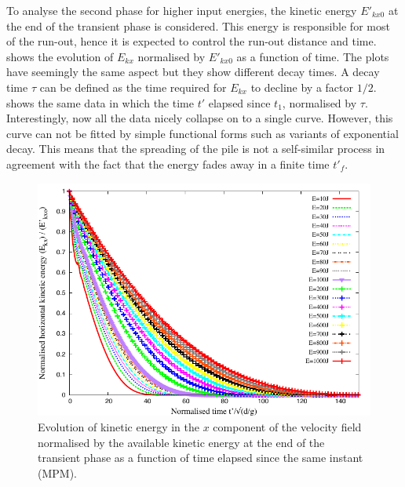 To analyse the second phase for higher input energies, the 
kinetic energy $E'_{kx0}$ at the end of the transient phase is 
considered. This energy is responsible for most of the run-out, hence it is 
expected to 
control the run-out distance and time.~ 
shows the evolution of $E_{kx}$ normalised by $E'_{kx0}$ as a function of time. 
The plots have seemingly the same aspect but they show different decay times. A 
decay time $\tau$ can be defined as the time required for $E_{kx}$ to decline 
by a factor $1/2$.~ shows the same data in 
which the time $t'$ elapsed since $t_1$, normalised by $\tau$. Interestingly, 
now all the data nicely collapse on to a single curve. However, this curve can 
not be fitted by simple functional forms such as variants of exponential decay. 
This means that the spreading of the pile is not a self-similar process in 
agreement with the fact that the energy fades away in a finite time $t'_f$. 

\clearpage

\begin{figure}[tbhp]
\centering
\includegraphics[width=\textwidth]{Normalised_KExExop_Slope}
\caption[Evolution of the normalised horizontal kinetic energy as function of 
time since the transient phase.]{Evolution of kinetic energy in the $x$ 
component of the velocity field normalised by the available kinetic energy at 
the
end of the transient phase as a function of time elapsed since the
same instant (MPM).}
\label{fig:Normalised_KExExop_Slope}
\end{figure}

